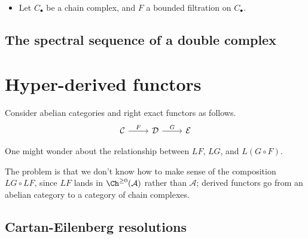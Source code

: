 \documentclass[main.tex]{subfiles}
\begin{document}
\begin{theorem}
  \leavevmode
  \begin{itemize}
    \item Let $C_{\bullet}$ be a chain complex, and $F$ a bounded filtration on $C_{\bullet}$.
  \end{itemize}
\end{theorem}

\subsection{The spectral sequence of a double complex}
\label{ssc:the_spectral_sequence_of_a_double_complex}

\section{Hyper-derived functors}
\label{sec:hyper_derived_functors}

Consider abelian categories and right exact functors as follows.
\begin{equation*}
  \begin{tikzcd}
    \mathcal{C}
    \arrow[r, "F"]
    & \mathcal{D}
    \arrow[r, "G"]
    & \mathcal{E}
  \end{tikzcd}
\end{equation*}

One might wonder about the relationship between $LF$, $LG$, and $L(G \circ F)$.

The problem is that we don't know how to make sense of the composition $LG \circ LF$, since $LF$ lands in $\Ch^{\geq 0}(\mathcal{A})$ rather than $\mathcal{A}$; derived functors go from an abelian category to a category of chain complexes.

\subsection{Cartan-Eilenberg resolutions}
\label{ssc:cartan_eilenberg_resolutions}
\end{document}
